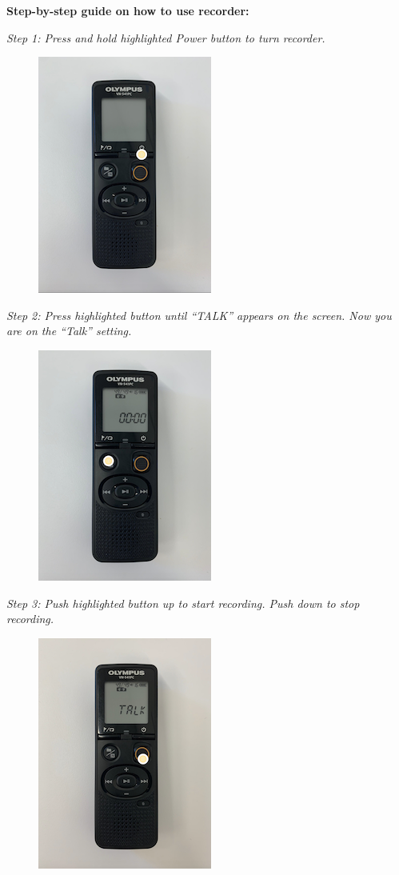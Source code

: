 \documentclass[]{book}
\begin{document}
\textbf{Step-by-step guide on how to use recorder:}

\emph{Step 1: Press and hold highlighted Power button to turn recorder.}

\begin{figure}
\centering
\includegraphics{images/ksads/1.png}
\caption{}
\end{figure}

\emph{Step 2: Press highlighted button until ``TALK'' appears on the screen. Now you are on the ``Talk'' setting.}

\begin{figure}
\centering
\includegraphics{images/ksads/2.png}
\caption{}
\end{figure}

\emph{Step 3: Push highlighted button up to start recording. Push down to stop recording.}

\begin{figure}
\centering
\includegraphics{images/ksads/3.png}
\caption{}
\end{figure}
\end{document}
